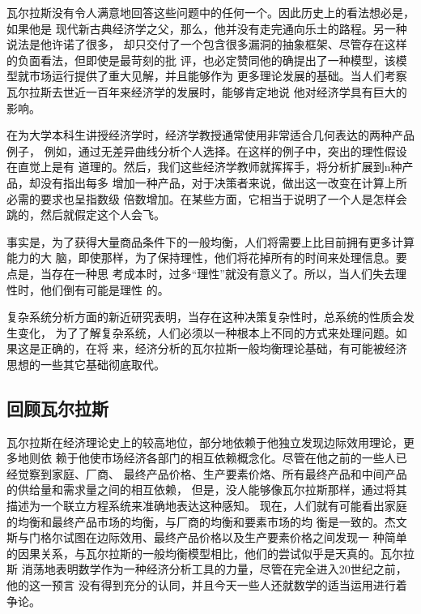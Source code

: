 瓦尔拉斯没有令人满意地回答这些问题中的任何一个。因此历史上的看法想必是，如果他是
现代新古典经济学之父，那么，他并没有走完通向乐土的路程。另一种说法是他许诺了很多，
却只交付了一个包含很多漏洞的抽象框架、尽管存在这样的负面看法，但即使是最苛刻的批
评，也必定赞同他的确提出了一种模型，该模型就市场运行提供了重大见解，并且能够作为
更多理论发展的基础。当人们考察瓦尔拉斯去世近一百年来经济学的发展时，能够肯定地说
他对经济学具有巨大的影响。

\begin{tcolorbox}[title = {一般均衡、复杂性以及人类大脑的极限},
  fonttitle = \sffamily\bfseries, fontupper = \small\itshape, fontlower =
  \small\itshape, left=20pt]
  \begin{multicols}{2}
    在为大学本科生讲授经济学时，经济学教授通常使用非常适合几何表达的两种产品例子，
    例如，通过无差异曲线分析个人选择。在这样的例子中，突出的理性假设在直觉上是有
    道理的。然后，我们这些经济学教师就挥挥手，将分析扩展到n种产品，却没有指出每多
    增加一种产品，对于决策者来说，做出这一改变在计算上所必需的要求也呈指数级
倍数增加。在某些方面，它相当于说明了一个人是怎样会跳的，然后就假定这个人会飞。

事实是，为了获得大量商品条件下的一般均衡，人们将需要上比目前拥有更多计算能力的大
脑，即使那样，为了保持理性，他们将花掉所有的时间来处理信息。要点是，当存在一种思
考成本时，过多“理性”就没有意义了。所以，当人们失去理性时，他们倒有可能是理性
的。

复杂系统分析方面的新近研究表明，当存在这种决策复杂性时，总系统的性质会发生变化，
为了了解复杂系统，人们必须以一种根本上不同的方式来处理问题。如果这是正确的，在将
来，经济分析的瓦尔拉斯一般均衡理论基础，有可能被经济思想的一些其它基础彻底取代。
  \end{multicols}
\end{tcolorbox}

\subsection{回顾瓦尔拉斯}

瓦尔拉斯在经济理论史上的较高地位，部分地依赖于他独立发现边际效用理论，更多地则依
赖于他使市场经济各部门的相互依赖概念化。尽管在他之前的一些人已经觉察到家庭、厂商、
最终产品价格、生产要素价烙、所有最终产品和中间产品的供给量和需求量之间的相互依赖，
但是，没人能够像瓦尔拉斯那样，通过将其描述为一个联立方程系统来准确地表达这种感知。
现在，人们就有可能看出家庭的均衡和最终产品市场的均衡，与厂商的均衡和要素市场的均
衡是一致的。杰文斯与门格尔试图在边际效用、最终产品价格以及生产要素价格之间发现一
种简单的因果关系，与瓦尔拉斯的一般均衡模型相比，他们的尝试似乎是天真的。瓦尔拉斯
消荡地表明数学作为一种经济分析工具的力量，尽管在完全进入20世纪之前，他的这一预言
没有得到充分的认同，并且今天一些人还就数学的适当运用进行着争论。

